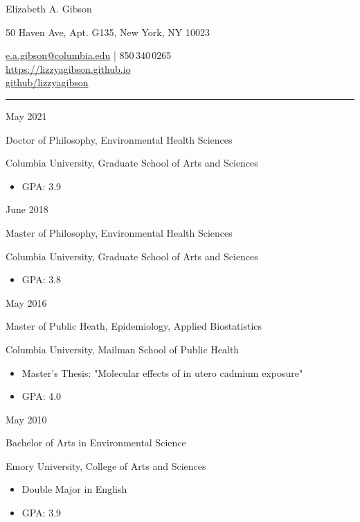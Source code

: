 \documentclass[a4paper,10pt]{article}
\newlength{\cvcolumngapwidth}
\newlength{\cvleftcolumnwidth}
\newlength{\cvrightcolumnwidth}
\newcommand{\cvnamestyle}[1]{{\LARGE\cvnamefont\textcolor{cvnamecolor}{#1}}}
\newcommand{\cvsectionstyle}[1]{{\normalsize\cvsectionfont\textcolor{cvsectioncolor}{#1}}}
\newcommand{\cvtitlestyle}[1]{{\large\cvtitlefont\textcolor{cvtitlecolor}{#1}}}
\newcommand{\cvdurationstyle}[1]{{\small\cvdurationfont\textcolor{cvdurationcolor}{#1}}}
\newlength{\cvafteritemskipamount}
\newlength{\cvaftersectionskipamount}
\newlength{\cvafternameskipamount}
\newlength{\cvaftertitleskipamount}
\newlength{\cvparskip}
\newcommand{\cvpersonalinfo}[2]{
    \begin{minipage}[t]{\cvleftcolumnwidth}
        \vspace{0mm} %
        \raggedleft #1
    \end{minipage}%
    \hspace{\cvcolumngapwidth}%
    \begin{minipage}[t]{\cvrightcolumnwidth}
        \vspace{0mm} %
        #2
    \end{minipage}

    \vspace{\cvafteritemskipamount}
}
\newcommand{\cvname}[1]{
    \cvnamestyle{#1}

    \vspace{\cvafternameskipamount}
}
\newcommand{\cvsection}[1]{
    \begin{minipage}[t]{\cvleftcolumnwidth}
        \raggedleft\cvsectionstyle{#1}
    \end{minipage}%
    \hspace{\cvcolumngapwidth}%
    \begin{minipage}[t]{\cvrightcolumnwidth}
        \textcolor{cvrulecolor}{\rule{\cvrightcolumnwidth}{0.3mm}}
    \end{minipage}

    \vspace{\cvaftersectionskipamount}
}
\newcommand{\cvitem}[2]{
    \begin{minipage}[t]{\cvleftcolumnwidth}
        \raggedleft #1
    \end{minipage}%
    \hspace{\cvcolumngapwidth}%
    \begin{minipage}[t]{\cvrightcolumnwidth}
        \setlength{\parskip}{\cvparskip} #2
    \end{minipage}

    \vspace{\cvafteritemskipamount}
}
\newcommand{\cvtitle}[1]{
    \cvtitlestyle{#1}

    \vspace{\cvaftertitleskipamount}
    \vspace{-\cvparskip}
}
\begin{document}

\cvpersonalinfo{
    \cvname{Elizabeth A. Gibson}

}{
    {
        50 Haven Ave, Apt. G135, New York, NY 10023
    }

    {
       \href{mailto:e.a.gibson@columbia.edu}{e.a.gibson@columbia.edu} | 850\,340\,0265 \\
       \href{https://lizzyagibson.github.io/index.html}{https://lizzyagibson.github.io} \\
       \href{https://github.com/lizzyagibson}{github/lizzyagibson}
        }
    
}


\cvsection{EDUCATION}

\cvitem{
    \cvdurationstyle{May 2021}
}{
    \cvtitle{Doctor of Philosophy, Environmental Health Sciences}

    Columbia University, Graduate School of Arts and Sciences
    \begin{itemize}[leftmargin=*]
	\item GPA: 3.9
    \end{itemize}
}

\cvitem{
    \cvdurationstyle{June 2018}
}{
    \cvtitle{Master of Philosophy, Environmental Health Sciences}
    Columbia University, Graduate School of Arts and Sciences
    \begin{itemize}[leftmargin=*]
	\item GPA: 3.8
    \end{itemize}
}

\cvitem{
    \cvdurationstyle{May 2016}
}{
    \cvtitle{Master of Public Heath, Epidemiology, Applied Biostatistics}

    Columbia University, Mailman School of Public Health

    \begin{itemize}[leftmargin=*]
        \item Master's Thesis: "Molecular effects of in utero cadmium exposure"
        \item GPA: 4.0
    \end{itemize}
}

\cvitem{
    \cvdurationstyle{May 2010}
}{
    \cvtitle{Bachelor of Arts in Environmental Science}

    Emory University, College of Arts and Sciences

    \begin{itemize}[leftmargin=*]
    	\item Double Major in English
	\item GPA: 3.9
    \end{itemize}
}
\end{document}

